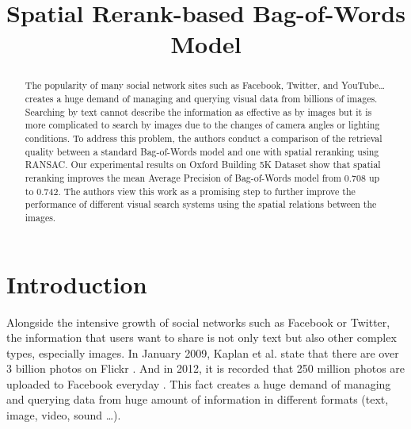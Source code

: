 \documentclass[10pt,conference,]{IEEEtran}
\begin{document}
\title{Spatial Rerank-based Bag-of-Words Model}

\author{
\and
{}
}

\maketitle


\begin{abstract}
The popularity of many social network sites such as Facebook, Twitter, and YouTube… creates a huge demand of managing and querying visual data from billions of images. Searching by text cannot describe the information as effective as by images but it is more complicated to search by images due to the changes of camera angles or lighting conditions. To address this problem, the authors conduct a comparison of the retrieval quality between a standard Bag-of-Words model and one with spatial reranking using RANSAC. Our experimental results on Oxford Building 5K Dataset show that spatial reranking improves the mean Average Precision of Bag-of-Words model from 0.708 up to 0.742. The authors view this work as a promising step to further improve the performance of different visual search systems using the spatial relations between the images.
\end{abstract}

\IEEEpeerreviewmaketitle

\section{Introduction} \label{section:introduction}
Alongside the intensive growth of social networks such as Facebook or Twitter, the information that users want to share is not only text but also other complex types, especially images. In January 2009, Kaplan et al. state that there are over 3 billion photos on Flickr \cite{Kaplan201059}. And in 2012, it is recorded that 250 million photos are uploaded to Facebook everyday \cite{1}. This fact creates a huge demand of managing and querying data from huge amount of information in different formats (text, image, video, sound \ldots).
\end{document}
